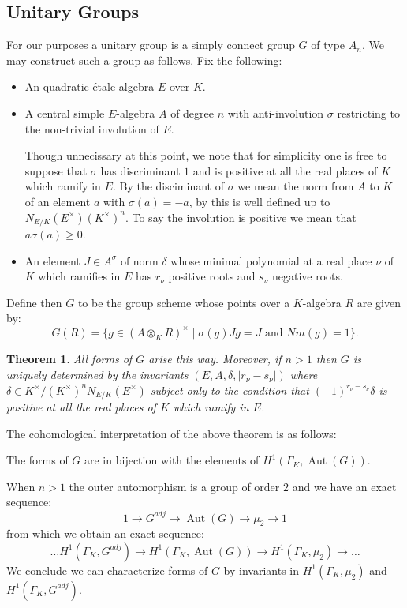 \documentclass{article}
\theoremstyle{plain}
\newtheorem{theorem}{Theorem}[section]
\theoremstyle{definition}
\numberwithin{equation}{section}
\DeclareMathOperator{\Aut}{Aut}
\newcommand{\GalKbK}{\Gamma_K}
\begin{document}
\subsection{Unitary Groups}

For our purposes a unitary group is a simply connect group $G$ of type $A_n$.
We may construct such a group as follows.
Fix the following:
\begin{itemize}
\item An quadratic \'etale algebra $E$ over $K$.
\item A central simple $E$-algebra $A$ of degree $n$ with anti-involution $\sigma$ restricting to the non-trivial involution of $E$.

         Though unnecissary at this point, we note that for simplicity one is free to suppose that $\sigma$ has discriminant $1$ and is positive at all the real places of $K$ which ramify in $E$.
         By the disciminant of $\sigma$ we mean the norm from $A$ to $K$ of an element $a$ with $\sigma(a)=-a$, by \cite[TODO]{book of involutions} this is well defined up to $N_{E/K}(E^\times)(K^\times)^n$. To say the involution is positive we mean that $a\sigma(a) \ge 0$.
     
\item An element $J\in A^\sigma$ of norm $\delta$ whose minimal polynomial at a real place $\nu$ of $K$ which ramifies in $E$ has $r_\nu$ positive roots and $s_\nu$ negative roots.
\end{itemize}
Define then $G$ to be the group scheme whose points over a $K$-algebra $R$ are given by:
\[ G(R) = \{ g\in (A\otimes_K R)^\times \mid \sigma(g)Jg = J \text{ and } Nm(g) = 1 \}. \]

\begin{theorem}
All forms of $G$ arise this way. Moreover, if $n>1$ then $G$ is uniquely determined by the invariants $(E,A,\delta, \left\vert r_\nu-s_\nu\right\vert)$ where $\delta \in K^\times/(K^\times)^nN_{E/K}(E^\times)$ subject only to the condition that $(-1)^{r_\nu-s_\nu}\delta$ is positive at all the real places of $K$ which ramify in $E$.
\end{theorem}
\cite[TODO]{book of involutions}

The cohomological interpretation of the above theorem is as follows:

The forms of $G$ are in bijection with the elements of $H^1(\GalKbK, \Aut(G))$.

When $n>1$ the outer automorphism is a group of order $2$ and we have an exact sequence:
\[ 1 \rightarrow   G^{adj} \rightarrow \Aut(G) \rightarrow \mu_2  \rightarrow 1 \]
from which we obtain an exact sequence:
\[ \ldots  H^1(\GalKbK, G^{adj})  \rightarrow  H^1(\GalKbK, \Aut(G)) \rightarrow  H^1(\GalKbK, \mu_2) \rightarrow \ldots \]
We conclude we can characterize forms of $G$ by invariants in $H^1(\GalKbK, \mu_2)$ and $H^1(\GalKbK, G^{adj})$.
\end{document}
